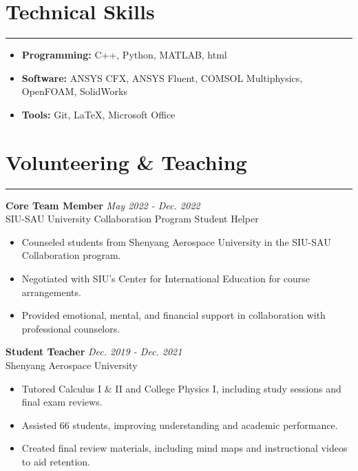 \documentclass[10pt]{article} %
\begin{document}
\vspace{2mm}

\section*{Technical Skills}
\hrule
\begin{itemize}[leftmargin=*,itemsep=1pt]
    \item \textbf{Programming:} C++, Python, MATLAB, html
    \item \textbf{Software:} ANSYS CFX, ANSYS Fluent, COMSOL Multiphysics, OpenFOAM, SolidWorks
    \item \textbf{Tools:} Git, LaTeX, Microsoft Office
\end{itemize}

\vspace{2mm}

\section*{Volunteering \& Teaching}
\hrule

\noindent\textbf{Core Team Member} \hfill \textit{May 2022 - Dec. 2022} \\
SIU-SAU University Collaboration Program Student Helper
\begin{itemize}[leftmargin=*,itemsep=1pt]
    \item Counseled students from Shenyang Aerospace University in the SIU-SAU Collaboration program.
    \item Negotiated with SIU's Center for International Education for course arrangements.
    \item Provided emotional, mental, and financial support in collaboration with professional counselors.
\end{itemize}

\vspace{2mm} 

\noindent \textbf{Student Teacher} \hfill \textit{Dec. 2019 - Dec. 2021} \\
Shenyang Aerospace University
\begin{itemize}[leftmargin=*,itemsep=1pt] 
    \item Tutored Calculus I \& II and College Physics I, including study sessions and final exam reviews.
    \item Assisted 66 students, improving understanding and academic performance.
    \item Created final review materials, including mind maps and instructional videos to aid retention.
\end{itemize}
\end{document}
